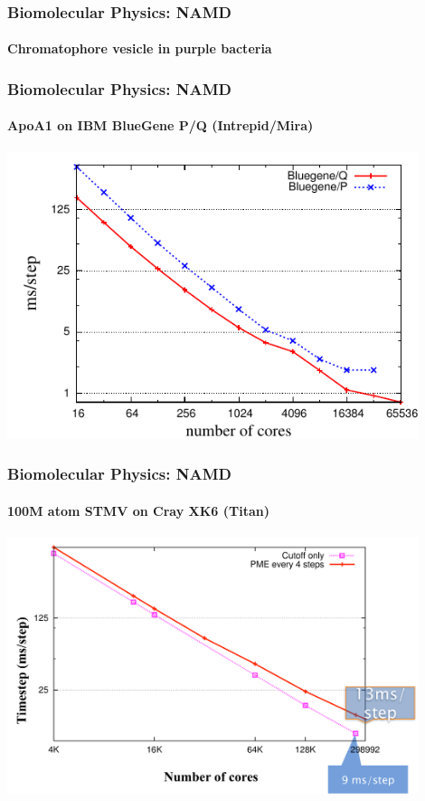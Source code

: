 {
\begin{frame}
\frametitle{Biomolecular Physics: NAMD}
\framesubtitle{Chromatophore vesicle in purple bacteria}
\end{frame}
}


\begin{frame}
\frametitle{Biomolecular Physics: NAMD}
\framesubtitle{ApoA1 on IBM BlueGene P/Q (Intrepid/Mira)}
\begin{center}
\includegraphics[width=0.9\textwidth]{../figures/apoa1-pme4-PQ.pdf}
\end{center}
\end{frame}


\begin{frame}
\frametitle{Biomolecular Physics: NAMD}
\framesubtitle{100M atom STMV on Cray XK6 (Titan)}
\includegraphics[width=0.9\textwidth]{../figures/namd_titan.pdf}
\end{frame}


